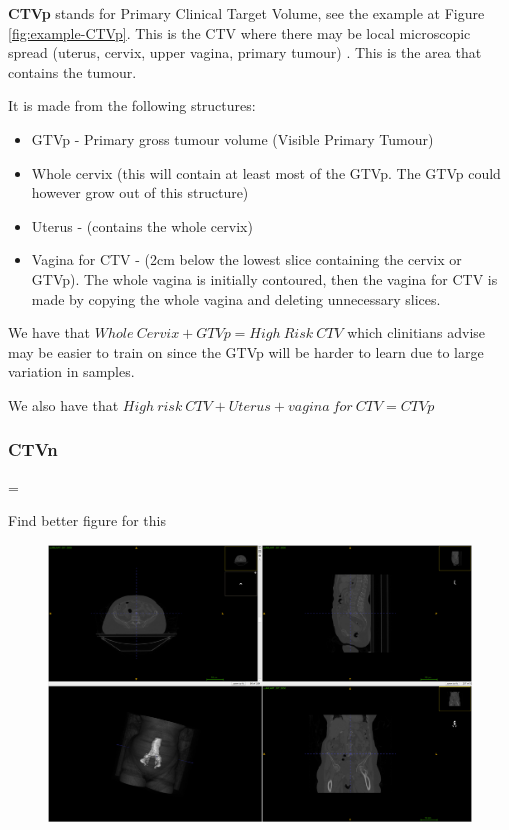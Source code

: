 \documentclass[11pt,twoside]{report}
\newenvironment{warning}
  {\par\begin{mdframed}[linewidth=1pt,linecolor=black]%
    \begin{list}{}{\leftmargin=1cm
                   \labelwidth=\leftmargin}\item[\Large\ding{43}]}
  {\end{list}\end{mdframed}\par}
\begin{document}
\textbf{CTVp} stands for Primary Clinical Target Volume, see the example at Figure \ref{fig:example-CTVp}. This is the CTV where there may be local microscopic spread (uterus, cervix, upper vagina, primary tumour) \cite{AMLART-data}. This is the area that contains the tumour.

It is made from the following structures:

\begin{itemize}
    \item GTVp - Primary gross tumour volume (Visible Primary Tumour)
    \item Whole cervix (this will contain at least most of the GTVp. The GTVp could however grow out of this structure)
    \item Uterus - (contains the whole cervix)
    \item Vagina for CTV - (2cm below the lowest slice containing the cervix or GTVp). The whole vagina is initially contoured, then the vagina for CTV is made by copying the whole vagina and deleting unnecessary slices. 
\end{itemize}

We have that $Whole\ Cervix + GTVp = High\ Risk\ CTV$ which clinitians advise may be easier to train on since the GTVp will be harder to learn due to large variation in samples.

We also have that $High\ risk\ CTV + Uterus + vagina\ for\ CTV = CTVp$

\subsubsection{CTVn}\label{sec:data-CTVn}

\begin{warning}
  Find better figure for this
\end{warning}

\begin{figure}[H]
  \centering
  \includegraphics[width=0.7\linewidth]{../figures/CTVn.png}
  \label{fig:example-CTVn}
\end{figure}
\end{document}
